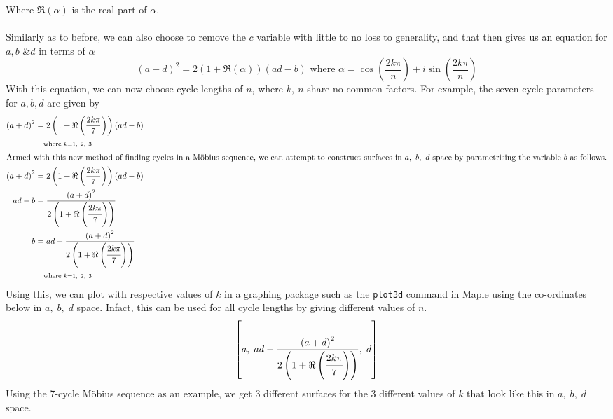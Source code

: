 \documentclass[12pt]{article}
\begin{document}
Where $\Re\left(\alpha\right)$ is the real part of $\alpha$.\\ \\
Similarly as to before, we can also choose to remove the $c$ variable with little to no loss to generality, and that then gives us an equation for $a, b \text{ \& } d$ in terms of $\alpha$
\[\left(a+d\right)^2=2\left(1+\Re\left(\alpha\right)\right)\left(ad-b\right) \text{	where	}\alpha=\cos\left(\frac{2k\pi}{n}\right)+i\sin\left(\frac{2k\pi}{n}\right)\]
With this equation, we can now choose cycle lengths of $n$, where $k,\ n$ share no common factors. For example, the seven cycle parameters for $a, b, d$ are given by
	\begin{align*}
		\left(a+d\right)^2 & =2\left(1+\Re\left(\frac{2k\pi}{7}\right)\right)\left(ad-b\right)               \\
		                   & \text{\footnotesize{\;\;\;	where	}}{\scriptstyle k=1,\ 2,\ 3}                   \\ \intertext{Armed with this new method of finding cycles in a Möbius sequence, we can attempt to construct surfaces in $a,\ b,\ d$ space by parametrising the variable $b$ as follows.}
		\left(a+d\right)^2 & =2\left(1+\Re\left(\frac{2k\pi}{7}\right)\right)\left(ad-b\right)               \\
		ad-b               & =\frac{\left(a+d\right)^2}{2\left(1+\Re\left(\cfrac{2k\pi}{7}\right)\right)}    \\
		b                  & =ad-\frac{\left(a+d\right)^2}{2\left(1+\Re\left(\cfrac{2k\pi}{7}\right)\right)} \\
		                   & \text{\footnotesize{\;\;\;	where	}}{\scriptstyle k=1,\ 2,\ 3}
	\end{align*}
Using this, we can plot with respective values of $k$ in a graphing package such as the \texttt{plot3d} command in Maple using the co-ordinates below in $a,\;b,\;d$ space. Infact, this can be used for all cycle lengths by giving different values of $n$.
\[\left[a,\;ad-\frac{\left(a+d\right)^2}{2\left(1+\Re\left(\cfrac{2k\pi}{7}\right)\right)},\;d\right]\]
Using the 7-cycle Möbius sequence as an example, we get 3 different surfaces for the 3 different values of $k$ that look like this in $a,\;b,\;d$ space.
\end{document}

